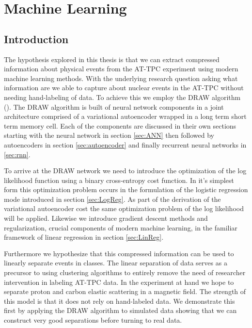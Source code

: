 \chapter{Machine Learning}\label{ch:ml}
\section{Introduction}

The hypothesis explored in this thesis is that we can extract compressed information about physical events from the AT-TPC experiment using modern machine learning methods. With the underlying research question asking what information are we able to capture about nuclear events in the AT-TPC without needing hand-labeling of data. To achieve this we employ the DRAW algorithm (\cite{Gregor2015}). The DRAW algorithm is built of neural network components in a joint architecture comprised of a variational autoencoder wrapped in a long term short term memory cell. Each  of the components are discussed in their own sections starting with the neural network in  section \ref{sec:ANN} then followed by autoencoders in section \ref{sec:autoencoder} and finally recurrent neural networks in \ref{sec:rnn}. 

\noindent To arrive at the DRAW network we need to introduce the optimization of the log likelihood function using a binary cross-entropy cost function. In it's simplest form this optimization problem occurs in the formulation of the logistic regression mode introduced in section \ref{sec:LogReg}. As part of the derivation of the variational autoencoder cost the same optimization problem of the log likelihood will be applied. Likewise we introduce gradient descent methods and regularization, crucial components of modern machine learning, in the familiar framework of linear regression in section \ref{sec:LinReg}. 

\noindent Furthermore we hypothesize that this compressed information can be used to linearly separate events in classes. The linear separation of data serves as a precursor to using clustering algorithms to entirely remove the need of researcher intervention in labeling AT-TPC data. In the experiment at hand we hope to separate proton and carbon elastic scattering in a magnetic field. The strength of this model is that it does not rely on hand-labeled data. We demonstrate this first by applying the DRAW algorithm to simulated data showing that we can construct very good separations before turning to real data.

